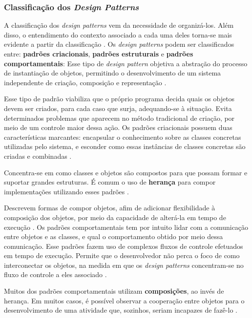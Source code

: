 \subsubsection{Classificação dos \textit{Design Patterns}}
A classificação dos \textit{design patterns} vem da necessidade de organizá-los.
Além disso, o entendimento do contexto associado a cada uma deles torna-se mais
evidente a partir da classificação \cite{gammaEtAl1994}. Os \textit{design patterns}
podem ser classificados entre: \textbf{padrões criacionais},
\textbf{padrões estruturais} e \textbf{padrões comportamentais}:
Esse tipo de \textit{design pattern} objetiva a abstração do processo de
instantiação de objetos, permitindo o desenvolvimento de um sistema independente
de criação, composição e representação \cite{gammaEtAl1994}.
\par
\indent Esse tipo de padrão viabiliza que o próprio programa decida quais os objetos
devem ser criados, para cada caso que surja, adequando-se à situação. Evita determinados
problemas que aparecem no método tradicional de criação, por meio de um controle
maior dessa ação. Os padrões criacionais possuem duas características marcantes:
encapsular o conhecimento sobre as classes concretas utilizadas pelo sistema, e
esconder como essas instâncias de classes concretas são criadas e combinadas
\cite{gammaEtAl1994}.
\par
\indent Concentra-se em como classes e objetos são compostos para que possam
formar e suportar grandes estruturas. É comum o uso de \textbf{herança} para
compor implementações utilizando esses padrões \cite{gammaEtAl1994}.
\par
\indent Descrevem formas de compor objetos, afim de adicionar flexibilidade à
composição dos objetos, por meio da capacidade de alterá-la em tempo de execução
\cite{gammaEtAl1994}.
Os padrões comportamentais tem por intuito lidar com a comunicação entre objetos
e as classes, e qual o comportamento obtido por meio dessa comunicação. Esse
padrões fazem uso de complexos fluxos de controle efetuados em tempo de execução.
Permite que o desenvolvedor não perca o foco de como interconectar os objetos,
na medida em que os \textit{design patterns} concentram-se no fluxo de controle
a eles associado \cite{gammaEtAl1994}.
\par
\indent Muitos dos padrões comportamentais utilizam \textbf{composições}, ao
invés de herança. Em muitos casos, é possível observar a cooperação entre objetos
para o desenvolvimento de uma atividade que, sozinhos, seriam incapazes de
fazê-lo \cite{gammaEtAl1994}.

